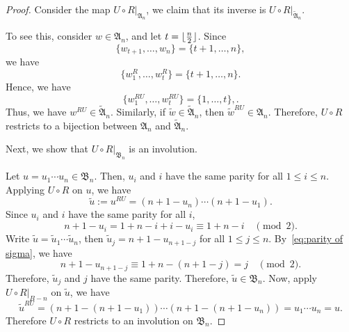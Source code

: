 \documentclass[12pt]{amsart}
\DeclarePairedDelimiter\floor{\lfloor}{\rfloor}
\theoremstyle{definition}
\numberwithin{equation}{section}
\newcommand{\defeq}{:=}
\begin{document}
\begin{proof}
    Consider the map $U\circ R \big|_{\mathfrak A_n}$, we claim that its inverse is $U\circ R \big|_{\tilde{\mathfrak A}_n}$.

    To see this, consider $w\in \mathfrak A_n$, and let $t= \floor{\tfrac{n}{2}}$. Since \begin{equation*}
        \{w_{t+1},\dotsc,w_n\} = \{t+1,\dotsc , n\},
    \end{equation*} we have \begin{equation*}
        \{w^R_1,\dotsc,w^R_t\} =\{t+1,\dotsc,n\}.
    \end{equation*}Hence, we have \begin{equation*}
        \{w^{RU}_1,\dotsc,w^{RU}_t\} = \{1,\dotsc,t\},.
    \end{equation*}Thus, we have $w^{RU} \in \tilde{\mathfrak A}_n$. Similarly, if $\tilde{w} \in \tilde{\mathfrak A}_n$, then $\tilde{w}^{RU} \in \mathfrak A_n$. Therefore, $U\circ R$ restricts to a bijection between $\mathfrak A_n$ and $\tilde{\mathfrak A}_n$.

    Next, we show that $U\circ R \big|_{\mathfrak B_n}$ is an involution.

    Let $u = u_1 \cdots u_n \in \mathfrak B_n$. Then, $u_i$ and $i$ have the same parity for all $1\leq i \leq n$. Applying $U\circ R$ on $u$, we have
    \begin{equation*}
         \tilde{u} \defeq u^{RU} = (n+1 - u_n) \cdots (n+1 - u_1).
    \end{equation*}
    Since $u_i$ and $i$ have the same parity for all $i$, \begin{equation}\label{eq:parity of sigma}
        n+1 - u_i = 1 + n-i +i -u_i \equiv 1+n-i \quad \pmod{2} .
    \end{equation}Write $\tilde{u} = \tilde{u}_1 \cdots \tilde{u}_n$, then $\tilde{u}_j = n+1 - u_{n+1-j}$ for all $1\leq j \leq n$. By~\eqref{eq:parity of sigma}, we have \begin{equation*}
        n+1 - u_{n+1-j} \equiv 1+n-(n+1-j) = j \quad \pmod{2}.
    \end{equation*} Therefore, $\tilde{u}_j$ and $j$ have the same parity. Therefore, $\tilde{u} \in \mathfrak B_n$. Now, apply $U \circ R\big|_{B-n}$ on $\tilde{u}$, we have \begin{equation*}
        \tilde{u}^{RU} = (n+1 -(n+1-u_1)) \cdots (n+1 -(n+1-u_n)) = u_1 \cdots u_n = u.
    \end{equation*} Therefore $U \circ R$ restricts to an involution on $\mathfrak B_n$.
    \end{proof}
\end{document}
